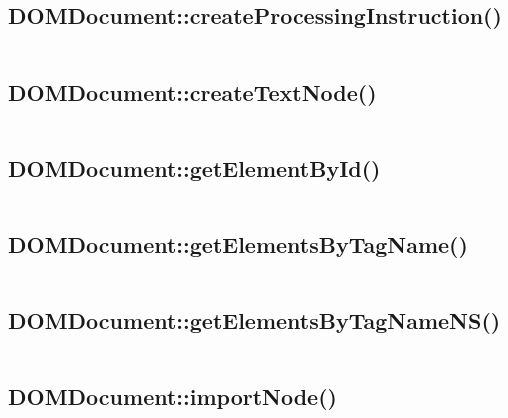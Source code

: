 \subsection{DOMDocument::createProcessingInstruction()}

\begin{lstlisting}[language=PHP]

\end{lstlisting}

\subsection{DOMDocument::createTextNode()}


\begin{lstlisting}[language=PHP]

\end{lstlisting}

\subsection{DOMDocument::getElementById()}

\begin{lstlisting}[language=PHP]

\end{lstlisting}

\subsection{DOMDocument::getElementsByTagName()}


\begin{lstlisting}[language=PHP]

\end{lstlisting}

\subsection{DOMDocument::getElementsByTagNameNS()}



\begin{lstlisting}[language=PHP]

\end{lstlisting}


\subsection{DOMDocument::importNode()}

\begin{lstlisting}[language=PHP]

\end{lstlisting}

